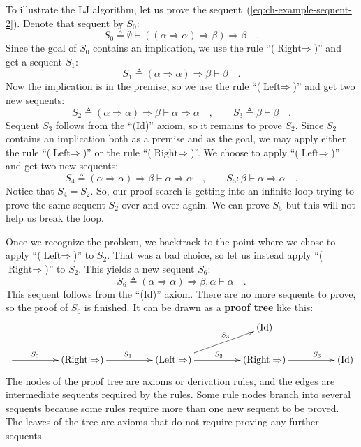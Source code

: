 To illustrate the LJ algorithm, let us prove the sequent~(\ref{eq:ch-example-sequent-2}).
Denote that sequent by $S_{0}$:
\[
S_{0}\triangleq\emptyset\vdash\left(\left(\alpha\Rightarrow\alpha\right)\Rightarrow\beta\right)\Rightarrow\beta\quad.
\]
 Since the goal of $S_{0}$ contains an implication, we use the rule
\textsf{``}($\text{Right}\Rightarrow$)\textsf{''} and get a sequent $S_{1}$:
\[
S_{1}\triangleq\left(\alpha\Rightarrow\alpha\right)\Rightarrow\beta\vdash\beta\quad.
\]
Now the implication is in the premise, so we use the rule \textsf{``}($\text{Left}\Rightarrow$)\textsf{''}
and get two new sequents:
\[
S_{2}\triangleq\left(\alpha\Rightarrow\alpha\right)\Rightarrow\beta\vdash\alpha\Rightarrow\alpha\quad,\quad\quad S_{3}\triangleq\beta\vdash\beta\quad.
\]
Sequent $S_{3}$ follows from the \textsf{``}(Id)\textsf{''} axiom, so it remains
to prove $S_{2}$. Since $S_{2}$ contains an implication both as
a premise and as the goal, we may apply either the rule \textsf{``}($\text{Left}\Rightarrow$)\textsf{''}
or the rule \textsf{``}($\text{Right}\Rightarrow$)\textsf{''}. We choose to apply
\textsf{``}($\text{Left}\Rightarrow$)\textsf{''} and get two new sequents:
\[
S_{4}\triangleq\left(\alpha\Rightarrow\alpha\right)\Rightarrow\beta\vdash\alpha\Rightarrow\alpha\quad,\quad\quad S_{5}:\beta\vdash\alpha\Rightarrow\alpha\quad.
\]
Notice that $S_{4}=S_{2}$. So, our proof search is getting into an
infinite loop trying to prove the same sequent $S_{2}$ over and over
again. We can prove $S_{5}$ but this will not help us break the loop.

Once we recognize the problem, we backtrack to the point where we
chose to apply \textsf{``}($\text{Left}\Rightarrow$)\textsf{''} to $S_{2}$. That
was a bad choice, so let us instead apply \textsf{``}($\text{Right}\Rightarrow$)\textsf{''}
to $S_{2}$. This yields a new sequent $S_{6}$:
\[
S_{6}\triangleq\left(\alpha\Rightarrow\alpha\right)\Rightarrow\beta,\alpha\vdash\alpha\quad.
\]
This sequent follows from the \textsf{``}(Id)\textsf{''} axiom. There are no more
sequents to prove, so the proof of $S_{0}$ is finished. It can be
drawn as a \textbf{proof tree} like this:
\[
\xymatrix{\xyScaleY{1.5pc}\xyScaleX{4pc} &  &  & (\text{Id})\\
\ar[r]\sp(0.35){S_{0}} & (\text{Right}\Rightarrow)\ar[r]\sp(0.5){S_{1}} & (\text{Left}\Rightarrow)\ar[r]\sp(0.5){S_{2}}\ar[ru]\sp(0.6){S_{3}} & (\text{Right}\Rightarrow)\ar[r]\sp(0.65){S_{6}} & (\text{Id})
}
\]
The nodes of the proof tree are axioms or derivation rules, and the
edges are intermediate sequents required by the rules. Some rule nodes
branch into several sequents because some rules require more than
one new sequent to be proved. The leaves of the tree are axioms that
do not require proving any further sequents. 

